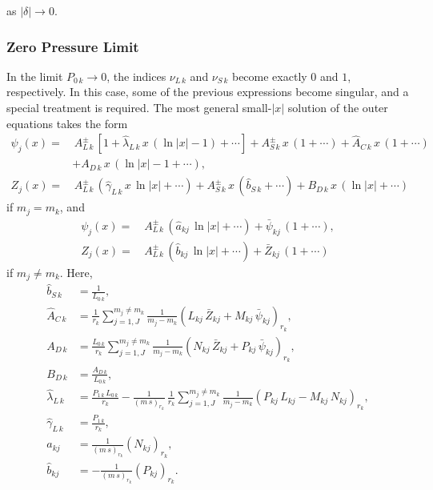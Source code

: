 \documentclass[12pt,prb,aps,notitlepage]{revtex4-1}
\begin{document}
as $|\delta|\rightarrow 0$.

\subsubsection{Zero Pressure Limit}
In the limit $P_{0\,k}\rightarrow 0$, the indices $\nu_{L\,k}$ and $\nu_{S\,k}$ become exactly $0$ and $1$, respectively.
In this case, some of the previous expressions become singular, and a special treatment is required. The most general small-$|x|$ solution of the outer equations
takes the form
\begin{align}
\psi_{j}(x)=&\, A_{L\,k}^\pm \,[1+\hat{\lambda}_{L\,k}\,x\,(\ln |x|-1)+\cdots] + A_{S\,k}^{\pm}\,x\,(1+\cdots) + \hat{A}_{C\,k}\,x\,(1+\cdots) \nonumber\\[0.5ex]&+ A_{D\,k}\,x\,(\ln |x|-1 + \cdots),\\[0.5ex]
Z_{j}(x)=&\, A_{L\,k}^\pm\,(\hat{\gamma}_{L\,k}\,x\,\ln |x|+\cdots) + A_{S\,k}^{\pm}\,x\,(\hat{b}_{S\,k}+\cdots)+ B_{D\,k}\,x\,(\ln |x|+\cdots)
\end{align}
if $m_j=m_k$, and 
\begin{align}
\psi_{j}(x)=&\, A_{L\,k}^\pm\,(\hat{a}_{kj}\,\ln |x|+\cdots)  + \bar{\psi}_{kj}\,(1+\cdots),\\[0.5ex]
Z_{j}(x)=&\, A_{L\,k}^\pm\,(\hat{b}_{kj} \,\ln |x|+\cdots) + \bar{Z}_{kj}\,(1+\cdots)
\end{align}
if $m_j\neq m_k$. Here, 
\begin{align}
\hat{b}_{S\,k} &= \frac{1}{L_{0\,k}},\\[0.5ex]
\hat{A}_{C\,k} &= \frac{1}{r_k}\sum_{j=1,J}^{m_j\neq m_k}\frac{1}{m_j-m_k}\left(L_{kj}\,\bar{Z}_{kj}+ M_{kj}\,\bar{\psi}_{kj}\right)_{r_k},\\[0.5ex]
A_{D\,k} &=  \frac{L_{0\,k}}{r_k}\sum_{j=1,J}^{m_j\neq m_k}\frac{1}{m_j-m_k}\left(N_{kj}\,\bar{Z}_{kj}+ P_{kj}\,\bar{\psi}_{kj}\right)_{r_k},\\[0.5ex]
B_{D\,k} &= \frac{A_{D\,k}}{L_{0\,k}},\\[0.5ex]
\hat{\lambda}_{L\,k} &= \frac{P_{1\,k}\,L_{0\,k} }{r_k}
-\frac{1}{(m\,s)_{r_k}}\,\frac{1}{r_k}\sum_{j=1,J}^{m_j\neq m_k}\frac{1}{m_j-m_k}\left(P_{kj}\,L_{kj}-M_{kj}\,N_{kj}\right)_{r_k},\\[0.5ex]
\hat{\gamma}_{L\,k} &=\frac{P_{1\,k}}{r_k},\\[0.5ex]
\hat{a}_{kj}&= \frac{1}{(m\,s)_{r_k}}\left(N_{kj}\right)_{r_k},\\[0.5ex]
\hat{b}_{kj}&= -\frac{1}{(m\,s)_{r_k}}\left( P_{kj}\right)_{r_k}.
\end{align}
\end{document}
